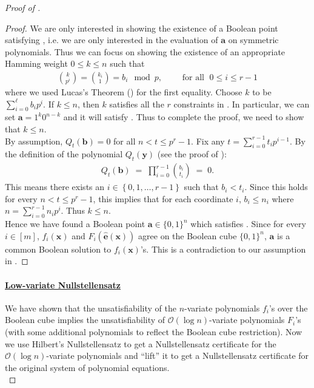 \documentclass[11pt]{article}
\newcommand{\Boo}{\{0,1 \}}
\newcommand{\bigO}{\mathcal{O}}
\newcommand{\set}[1]{\left\{ #1 \right\}}
\begin{document}
\begin{proof}[Proof of ]
\begin{proof}
\noindent
We are only interested in showing the existence of a Boolean point satisfying , i.e. we are only interested in the evaluation of $\mathbf{a}$ on symmetric polynomials. Thus we can focus on showing the existence of an appropriate Hamming weight $0 \leq k \leq n$ such that
\begin{align*}
    \binom{k}{p^{i}} = \binom{k_{i}}{1} = b_{i} \mod{p}, \quad \quad \text{ for all } \; 0 \leq i \leq r-1 
\end{align*}
where we used Lucas's Theorem () for the first equality. Choose $k$ to be $\sum_{i = 0}^{\ell} b_{i} p^{i}$. If $k \leq n$, then $k$ satisfies all the $r$ constraints in . In particular, we can set $\mathbf{a} = 1^{k} 0^{n-k}$ and it will satisfy . Thus to complete the proof, we need to show that $k \leq n$.\\

\noindent
By assumption, $Q_{t}(\mathbf{b}) = 0$ for all $n < t \leq p^{r}-1$. Fix any $t = \sum_{i=0}^{r-1} t_{i} p^{i-1}$. By the definition of the polynomial $Q_{t}(\mathbf{y})$ (see the proof of ):
\begin{align*}
    Q_{t}(\mathbf{b}) \; = \; \prod_{i=0}^{r-1} \binom{b_{i}}{t_{i}} \; = \; 0.
\end{align*}
This means there exists an $i \in \set{0,1,\ldots,r-1}$ such that $b_{i} < t_{i}$. Since this holds for every $n < t \leq p^{r}-1$, this implies that for each coordinate $i$, $b_{i} \leq n_{i}$ where $n = \sum_{i=0}^{r-1} n_{i} p^{i}$. Thus $k \leq n$.\\

\noindent
Hence we have found a Boolean point $\mathbf{a} \in \Boo^{n}$ which satisfies . Since for every $i \in [m]$, $f_{i}(\mathbf{x})$ and $F_{i}(\widehat{\mathbf{e}}(\mathbf{x}))$ agree on the Boolean cube $\Boo^{n}$, $\mathbf{a}$ is a common Boolean solution to $f_{i}(\mathbf{x})$'s. This is a contradiction to our assumption in .
\end{proof}


\paragraph{\underline{Low-variate Nullstellensatz}}We have shown that the unsatisfiability of the $n$-variate polynomials $f_{i}$'s over the Boolean cube implies the unsatisfiability of $\bigO(\log n)$-variate polynomials $F_{i}$'s (with some additional polynomials to reflect the Boolean cube restriction). Now we use Hilbert's Nullstellensatz to get a Nullstellensatz certificate for the $\bigO(\log n)$-variate polynomials and ``lift'' it to get a Nullstellensatz certificate for the original system of polynomial equations.\\


\end{proof}
\end{document}
